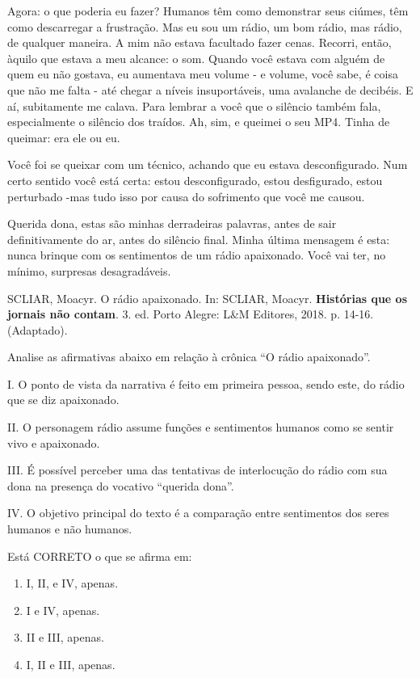Agora: o que poderia eu fazer? Humanos têm como demonstrar seus ciúmes, têm como descarregar a frustração. Mas eu sou um rádio, um bom rádio, mas rádio, de qualquer maneira. A mim não estava facultado fazer cenas. Recorri, então, àquilo que estava a meu alcance: o som. Quando você estava com alguém de quem eu não gostava, eu aumentava meu volume - e volume, você sabe, é coisa que não me falta - até chegar a níveis insuportáveis, uma avalanche de decibéis. E aí, subitamente me calava. Para lembrar a você que o silêncio também fala, especialmente o silêncio dos traídos. Ah, sim, e queimei o seu MP4. Tinha de queimar: era ele ou eu.

Você foi se queixar com um técnico, achando que eu estava desconfigurado. Num certo sentido você está certa: estou desconfigurado, estou desfigurado, estou perturbado -mas tudo isso por causa do sofrimento que você me causou.

Querida dona, estas são minhas derradeiras palavras, antes de sair definitivamente do ar, antes do silêncio final. Minha última mensagem é esta: nunca brinque com os sentimentos de um rádio apaixonado. Você vai ter, no mínimo, surpresas desagradáveis.

SCLIAR, Moacyr. O rádio apaixonado. In: SCLIAR, Moacyr. \textbf{Histórias que os jornais não contam}. 3. ed. Porto Alegre: L\&M Editores, 2018. p. 14-16. (Adaptado).

Analise as afirmativas abaixo em relação à crônica “O rádio apaixonado”.

\par

I. O ponto de vista da narrativa é feito em primeira pessoa, sendo este, do rádio que se diz apaixonado.\par
II. O personagem rádio assume funções e sentimentos humanos como se sentir vivo e apaixonado.\par
III. É possível perceber uma das tentativas de interlocução do rádio com sua dona na presença do vocativo “querida dona”.\par
IV. O objetivo principal do texto é a comparação entre sentimentos dos seres humanos e não humanos.

\par

Está CORRETO o que se afirma em:\begin{enumerate}
\item I, II, e IV, apenas.
\item I e IV, apenas.
\item II e III, apenas.
\item I, II e III, apenas.\end{enumerate}
